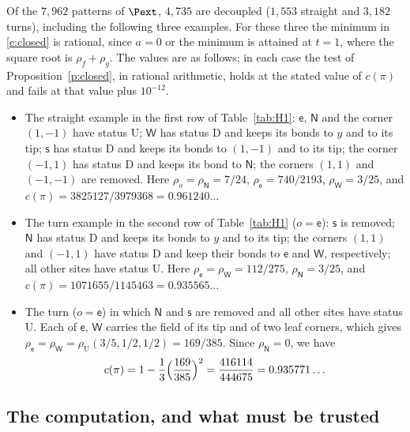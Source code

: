 Of the $7{,}962$ patterns of $\Pext$, $4{,}735$ are decoupled ($1{,}553$ straight and $3{,}182$ turns), including the following three examples. For these three the minimum in \eqref{e:closed} is rational, since $a = 0$ or the minimum is attained at $t = 1$, where the square root is $\rho_f + \rho_g$. The values are as follows; in each case the test of Proposition~\ref{p:closed}, in rational arithmetic, holds at the stated value of $c(\pi)$ and fails at that value plus $10^{-12}$.
\begin{itemize}
\item The straight example in the first row of Table~\ref{tab:H1}: $\mathsf e$, $\mathsf N$ and the corner $(1, -1)$ have status $\mathrm U$; $\mathsf W$ has status $\mathrm D$ and keeps its bonds to $y$ and to its tip; $\mathsf s$ has status $\mathrm D$ and keeps its bonds to $(1, -1)$ and to its tip; the corner $(-1, 1)$ has status $\mathrm D$ and keeps its bond to $\mathsf N$; the corners $(1, 1)$ and $(-1, -1)$ are removed. Here $\rho_o = \rho_{\mathsf N} = 7/24$, $\rho_{\mathsf e} = 740/2193$, $\rho_{\mathsf W} = 3/25$, and $c(\pi) = 3825127/3979368 = 0.961240\ldots$
\item The turn example in the second row of Table~\ref{tab:H1} ($o = \mathsf e$): $\mathsf s$ is removed; $\mathsf N$ has status $\mathrm D$ and keeps its bonds to $y$ and to its tip; the corners $(1, 1)$ and $(-1, 1)$ have status $\mathrm D$ and keep their bonds to $\mathsf e$ and $\mathsf W$, respectively; all other sites have status $\mathrm U$. Here $\rho_{\mathsf e} = \rho_{\mathsf W} = 112/275$, $\rho_{\mathsf N} = 3/25$, and $c(\pi) = 1071655/1145463 = 0.935565\ldots$
\item The turn ($o = \mathsf e$) in which $\mathsf N$ and $\mathsf s$ are removed and all other sites have status $\mathrm U$. Each of $\mathsf e$, $\mathsf W$ carries the field of its tip and of two leaf corners, which gives $\rho_{\mathsf e} = \rho_{\mathsf W} = \rho_{\mathrm U}(3/5, 1/2, 1/2) = 169/385$. Since $\rho_{\mathsf N} = 0$, we have
\begin{equation}\label{e:5469}
c(\pi) = 1 - \frac13 \Bigl( \frac{169}{385} \Bigr)^2 = \frac{416114}{444675} = 0.935771\ldots
\end{equation}
\end{itemize}

\subsection{The computation, and what must be trusted}\label{s:localcomp}

